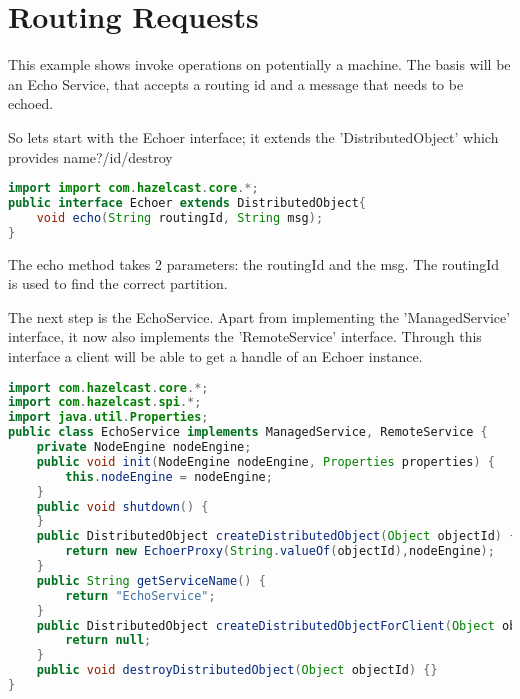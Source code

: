 \section{Routing Requests}
This example shows invoke operations on potentially a machine. The basis will be an Echo Service, that accepts a routing id and a message that needs to be echoed.

So lets start with the Echoer interface; it extends the 'DistributedObject' which provides name?/id/destroy
\begin{lstlisting}[language=java]
import import com.hazelcast.core.*;
public interface Echoer extends DistributedObject{
    void echo(String routingId, String msg);
}
\end{lstlisting}
The echo method takes 2 parameters: the routingId and the msg. The routingId is used to find the correct partition. 

The next step is the EchoService. Apart from implementing the 'ManagedService' interface, it now also implements the 'RemoteService' interface. Through this interface a client will be able to get a handle of an Echoer instance.
\begin{lstlisting}[language=java]
import com.hazelcast.core.*;
import com.hazelcast.spi.*;
import java.util.Properties;
public class EchoService implements ManagedService, RemoteService {
    private NodeEngine nodeEngine;
    public void init(NodeEngine nodeEngine, Properties properties) {
        this.nodeEngine = nodeEngine;
    }
    public void shutdown() {
    }
    public DistributedObject createDistributedObject(Object objectId) {
        return new EchoerProxy(String.valueOf(objectId),nodeEngine);
    }
    public String getServiceName() {
        return "EchoService";
    }
    public DistributedObject createDistributedObjectForClient(Object objectId) {
        return null;
    }
    public void destroyDistributedObject(Object objectId) {}
}
\end{lstlisting}



